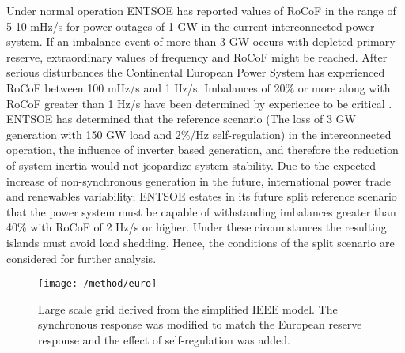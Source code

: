 Under normal operation ENTSOE has reported values of RoCoF in the range of 5-10 mHz/s for power outages of 1 GW in the current interconnected power system. If an imbalance event of more than 3 GW occurs with depleted primary reserve, extraordinary values of frequency and RoCoF might be reached. After serious disturbances the Continental European Power System has experienced RoCoF between 100 mHz/s and 1 Hz/s. Imbalances of 20\% or more along with RoCoF greater than 1 Hz/s have been determined by experience to be critical \cite{ENTSOE.2016}.
ENTSOE has determined that the reference scenario (The loss of 3 GW generation with 150 GW load and 2\%/Hz self-regulation) in the interconnected operation, the influence of inverter based generation, and therefore the reduction of system inertia would not jeopardize system stability. Due to the expected increase of non-synchronous generation in the future, international power trade and renewables variability; ENTSOE estates in its future split reference scenario that the power system must be capable of withstanding imbalances greater than 40\% with RoCoF of 2 Hz/s or higher. Under these circumstances the resulting islands must avoid load shedding. Hence, the conditions of the split scenario are considered for further analysis.
\begin{figure}[h]
	\centering
	\texttt{[image: /method/euro]}
	\caption{Large scale grid derived from the simplified IEEE model. The synchronous response was modified to match the European reserve response and the effect of self-regulation was added.}
	\label{fig:euro}
\end{figure}

